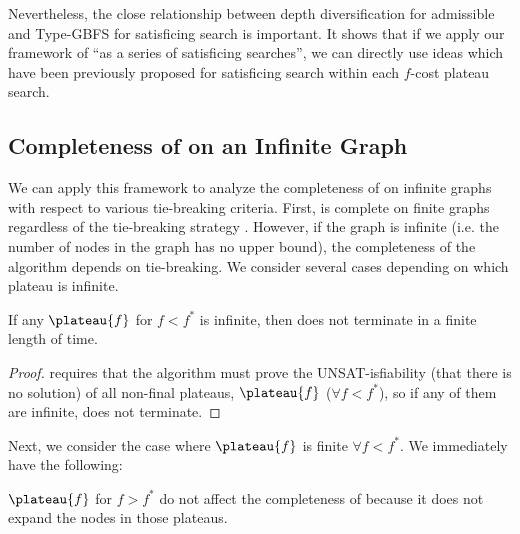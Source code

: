 Nevertheless, the close relationship between depth diversification for admissible \astar and Type-GBFS for satisficing search is important. It shows that if we apply our framework of ``\astar as a series of satisficing searches'', we can directly use ideas which have been previously proposed for satisficing search within each $f$-cost plateau search.

\subsection{Completeness of \astar on an Infinite Graph}
\label{sec:completeness-on-infinite-space}

We can apply this framework to analyze the completeness of \astar on infinite graphs with respect to various tie-breaking criteria.
First, \astar is complete on finite graphs regardless of the tie-breaking strategy \cite{hart1968formal}.
However, if the graph is infinite (i.e. the number of nodes in the graph has no upper bound), the completeness of the algorithm depends on tie-breaking.
We consider several cases depending on which plateau is infinite.

\begin{propo}
 If any $\plateau{f}$ for $f<f^*$ is infinite, then \astar does not terminate in a finite length of time.
\end{propo}

\begin{proof}
  requires that the algorithm must prove the UNSAT-isfiability (that there is no solution) of all non-final plateaus, $\plateau{f}$ ($\forall f<f^*$), so if any of them are infinite, \astar does not terminate.
\end{proof}

Next, we consider the case where $\plateau{f}$ is finite $\forall f<f^*$.
We immediately have the following:

\begin{propo}
 $\plateau{f}$ for $f>f^*$ do not affect the completeness of \astar because
 it does not expand the nodes in those plateaus.
\end{propo}



